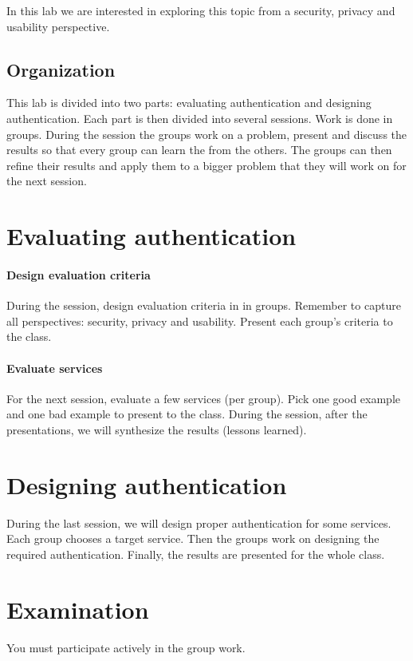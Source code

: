 In this lab we are interested in exploring this topic from a security, privacy 
and usability perspective.

\subsection{Organization}

This lab is divided into two parts: evaluating authentication and designing 
authentication.
Each part is then divided into several sessions.
Work is done in groups.
During the session the groups work on a problem, present and discuss the 
results so that every group can learn the from the others.
The groups can then refine their results and apply them to a bigger problem 
that they will work on for the next session.


\section{Evaluating authentication}

\paragraph{Design evaluation criteria}

During the session, design evaluation criteria in in groups.
Remember to capture all perspectives: security, privacy and usability.
Present each group's criteria to the class.

\paragraph{Evaluate services}

For the next session, evaluate a few services (per group).
Pick one good example and one bad example to present to the class.
During the session, after the presentations, we will synthesize the results 
(lessons learned).


\section{Designing authentication}

During the last session, we will design proper authentication for some 
services.
Each group chooses a target service.
Then the groups work on designing the required authentication.
Finally, the results are presented for the whole class.


\section{Examination}

You must participate actively in the group work.



\begin{frame}[allowframebreaks]
  \printbibliography
\end{frame}
